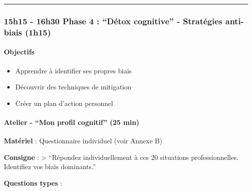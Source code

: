 \documentclass[
]{article}
\providecommand{\tightlist}{%
  \setlength{\itemsep}{0pt}\setlength{\parskip}{0pt}}
\begin{document}
\begin{center}\rule{0.5\linewidth}{0.5pt}\end{center}

\subsubsection{\texorpdfstring{\textbf{15h15 - 16h30 \textbar{} Phase 4
: ``Détox cognitive'' - Stratégies anti-biais
(1h15)}}{15h15 - 16h30 \textbar{} Phase 4 : ``Détox cognitive'' - Stratégies anti-biais (1h15)}}\label{h15---16h30-phase-4-duxe9tox-cognitive---stratuxe9gies-anti-biais-1h15}

\paragraph{Objectifs}\label{objectifs-4}

\begin{itemize}
\tightlist
\item
  Apprendre à identifier ses propres biais
\item
  Découvrir des techniques de mitigation
\item
  Créer un plan d'action personnel
\end{itemize}

\paragraph{Atelier - ``Mon profil cognitif'' (25
min)}\label{atelier---mon-profil-cognitif-25-min}

\textbf{Matériel} : Questionnaire individuel (voir Annexe B)

\textbf{Consigne} : \textgreater{} ``Répondez individuellement à ces 20
situations professionnelles. Identifiez vos biais dominants.''

\textbf{Questions types} :
\end{document}
